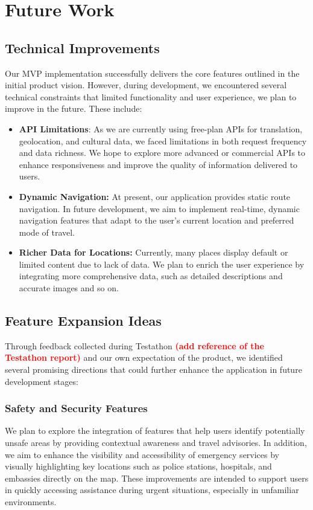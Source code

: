 \chapter{Future Work}
\section{Technical Improvements}
Our MVP implementation successfully delivers the core features outlined in the initial product vision. However, during development, we encountered several technical constraints that limited functionality and user experience, we plan to improve in the future. These include:
    \begin{itemize}
        \item \textbf{API Limitations}: As we are currently using free-plan APIs for translation, geolocation, and cultural data, we faced limitations in both request frequency and data richness. We hope to explore more advanced or commercial APIs to enhance responsiveness and improve the quality of information delivered to users.
        \item \textbf{Dynamic Navigation:} At present, our application provides static route navigation. In future development, we aim to implement real-time, dynamic navigation features that adapt to the user’s current location and preferred mode of travel.
        \item \textbf{Richer Data for Locations:} Currently, many places display default or limited content due to lack of data. We plan to enrich the user experience by integrating more comprehensive data, such as detailed descriptions and accurate images and so on.
    \end{itemize}
\section{Feature Expansion Ideas}
Through feedback collected during Testathon \textbf{\textcolor{red}{(add reference of the Testathon report)}} and our own expectation of the product, we identified several promising directions that could further enhance the application in future development stages:

\subsection{Safety and Security Features}
We plan to explore the integration of features that help users identify potentially unsafe areas by providing contextual awareness and travel advisories. In addition, we aim to enhance the visibility and accessibility of emergency services by visually highlighting key locations such as police stations, hospitals, and embassies directly on the map. These improvements are intended to support users in quickly accessing assistance during urgent situations, especially in unfamiliar environments.

